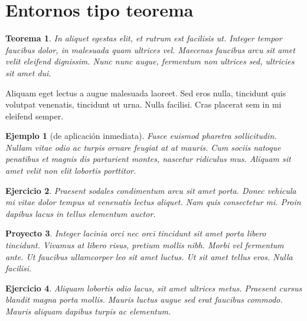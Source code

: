 \documentclass[11pt,a4paper]{report}
\newtheorem{Teorema}[definicion]{Teorema}}
\newtheorem{Ejemplo}{Ejemplo}
\newtheorem{Ejercicio}[Ejemplo]{Ejercicio}
\newtheorem{Proyecto}[Ejemplo]{Proyecto}}
\begin{document}
\section{Entornos tipo teorema}\label{sec_teoremas}




\begin{Teorema}
In aliquet egestas elit, et rutrum est facilisis ut. Integer tempor faucibus dolor, in malesuada quam ultrices vel. Maecenas faucibus arcu sit amet velit eleifend dignissim. Nunc nunc augue, fermentum non ultrices sed, ultricies sit amet dui. 
\end{Teorema}





\begin{definicion}
Aliquam eget lectus a augue malesuada laoreet. Sed eros nulla, tincidunt quis volutpat venenatis, tincidunt ut urna. Nulla facilisi. Cras placerat sem in mi eleifend semper. 
\end{definicion}




\begin{Ejemplo}[de aplicación inmediata]
Fusce euismod pharetra sollicitudin. Nullam vitae odio ac turpis ornare feugiat at at mauris. Cum sociis natoque penatibus et magnis dis parturient montes, nascetur ridiculus mus. Aliquam sit amet velit non elit lobortis porttitor. 
\end{Ejemplo}




\begin{Ejercicio}
Praesent sodales condimentum arcu sit amet porta. Donec vehicula mi vitae dolor tempus ut venenatis lectus aliquet. Nam quis consectetur mi. Proin dapibus lacus in tellus elementum auctor. 
\end{Ejercicio}




\begin{Proyecto}
Integer lacinia orci nec orci tincidunt sit amet porta libero tincidunt. Vivamus at libero risus, pretium mollis nibh. Morbi vel fermentum ante. Ut faucibus ullamcorper leo sit amet luctus. Ut sit amet tellus eros. Nulla facilisi. 
\end{Proyecto}




\begin{Ejercicio}
Aliquam lobortis odio lacus, sit amet ultrices metus. Praesent cursus blandit magna porta mollis. Mauris luctus augue sed erat faucibus commodo. Mauris aliquam dapibus turpis ac elementum.
\end{Ejercicio}
\end{document}
